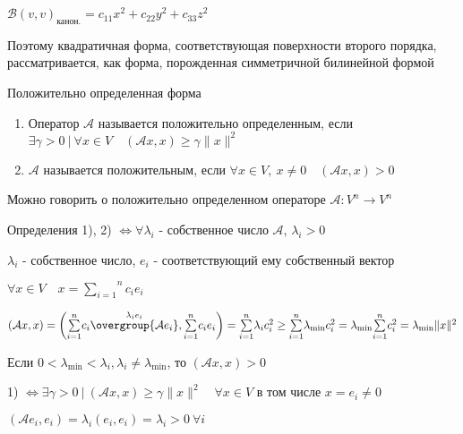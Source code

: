 \documentclass[12pt]{article}
\begin{document}
    $\mathcal{B}(v, v)_{\text{канон.}} = c_{11}x^2 + c_{22}y^2 + c_{33}z^2$

    Поэтому квадратичная форма, соответствующая поверхности второго порядка, рассматривается, как форма, порожденная симметричной билинейной формой

    \hypertarget{positivedefinedoperator}{}

    \Def Положительно определенная форма

    \begin{enumerate}[label*=\arabic*) ]
        \item Оператор $\mathcal{A}$ называется положительно определенным, если $\exists \gamma > 0 \ | \ \forall x \in V \quad (\mathcal{A}x, x) \geq \gamma \|x\|^2$

        \item $\mathcal{A}$ называется положительным, если
        $\forall x \in V, \ x \neq 0 \quad (\mathcal{A}x, x) > 0$
    \end{enumerate}

    \Nota Можно говорить о положительно определенном операторе $\mathcal{A}: V^n \rightarrow V^n$

    \begin{MyTheorem}
        \Ths Определения 1), 2) $\Longleftrightarrow \forall \lambda_i$ - собственное число $\mathcal{A}$, $\lambda_i > 0$
    \end{MyTheorem}

    \begin{MyProof}
        \fbox{$\Longrightarrow$} $\lambda_i$ - собственное число, $e_i$ - соответствующий ему собственный вектор

        $\forall x \in V \quad x = \overset{n}{\underset{i = 1}{\sum}} c_i e_i$

        $(\mathcal{A}x, x) = \left(\overset{n}{\underset{i = 1}{\sum}} c_i \overset{\lambda_i e_i}{\overgroup{\mathcal{A}e_i}}, \overset{n}{\underset{i = 1}{\sum}} c_i e_i\right) =
        \overset{n}{\underset{i = 1}{\sum}} \lambda_i c_i^2 \geq \overset{n}{\underset{i = 1}{\sum}}\lambda_{\min} c_i^2 =
        \lambda_{\min} \overset{n}{\underset{i = 1}{\sum}}c_i^2 = \lambda_{\min} \|x\|^2$

        Если $0 < \lambda_{\min} < \lambda_i, \lambda_i \neq \lambda_{\min}$, то $(\mathcal{A}x, x) > 0$

        \fbox{$\Longleftarrow$} 1) $\Longleftrightarrow \exists \gamma > 0 \ | \ (\mathcal{A}x, x) \geq \gamma \|x\|^2 \quad \forall x \in V$ в том числе $x = e_i \neq 0$

        $(\mathcal{A}e_i, e_i) = \lambda_i (e_i, e_i) = \lambda_i > 0 \ \forall i$

    \end{MyProof}
\end{document}
